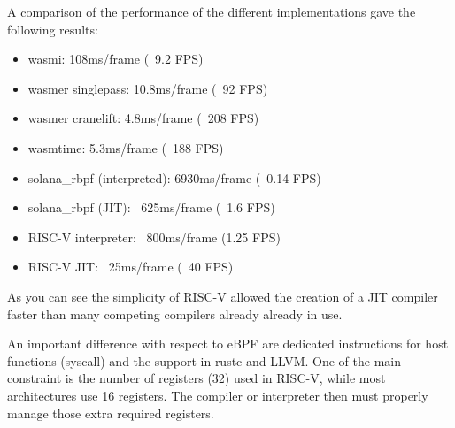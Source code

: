 \documentclass[../main.tex]{subfiles}
\begin{document}

A comparison of the performance of the different implementations gave the following results:

\begin{itemize}
    \item wasmi: 108ms/frame (~9.2 FPS)
    \item wasmer singlepass: 10.8ms/frame (~92 FPS)
    \item wasmer cranelift: 4.8ms/frame (~208 FPS)
    \item wasmtime: 5.3ms/frame (~188 FPS)
    \item solana\_rbpf (interpreted): 6930ms/frame (~0.14 FPS)
    \item solana\_rbpf (JIT): ~625ms/frame (~1.6 FPS)
    \item RISC-V interpreter: ~800ms/frame (1.25 FPS)
    \item RISC-V JIT: ~25ms/frame (~40 FPS)
\end{itemize}

As you can see the simplicity of RISC-V allowed the creation of a JIT compiler faster than many competing compilers already already in use.

An important difference with respect to  eBPF are dedicated instructions for host functions (syscall) and the support in rustc and LLVM. One of the main constraint is the number of registers (32) used in RISC-V, while most architectures use 16 registers. The compiler or interpreter then must properly manage those extra required registers.
\end{document}

